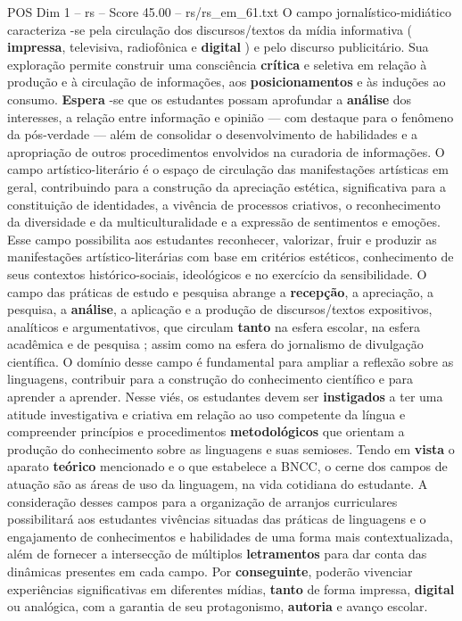 \begin{textsample}{POS Dim 1 – rs – Score 45.00 – rs/rs\_em\_61.txt}
O campo jornalístico-midiático caracteriza -se pela circulação dos discursos/textos da mídia informativa ( \textbf{impressa}, televisiva, radiofônica e \textbf{digital} ) e pelo discurso publicitário.
Sua exploração permite construir uma consciência \textbf{crítica} e seletiva em relação à produção e à circulação de informações, aos \textbf{posicionamentos} e às induções ao consumo. \textbf{Espera} -se que os estudantes possam aprofundar a \textbf{análise} dos interesses, a relação entre informação e opinião — com destaque para o fenômeno da pós-verdade — além de consolidar o desenvolvimento de habilidades e a apropriação de outros procedimentos envolvidos na curadoria de informações.
O campo artístico-literário é o espaço de circulação das manifestações artísticas em geral, contribuindo para a construção da apreciação estética, significativa para a constituição de identidades, a vivência de processos criativos, o reconhecimento da diversidade e da multiculturalidade e a expressão de sentimentos e emoções.
Esse campo possibilita aos estudantes reconhecer, valorizar, fruir e produzir as manifestações artístico-literárias com base em critérios estéticos, conhecimento de seus contextos histórico-sociais, ideológicos e no exercício da sensibilidade.
O campo das práticas de estudo e pesquisa abrange a \textbf{recepção}, a apreciação, a pesquisa, a \textbf{análise}, a aplicação e a produção de discursos/textos expositivos, analíticos e argumentativos, que circulam \textbf{tanto} na esfera escolar, na esfera acadêmica e de pesquisa ; assim como na esfera do jornalismo de divulgação científica.
O domínio desse campo é fundamental para ampliar a reflexão sobre as linguagens, contribuir para a construção do conhecimento científico e para aprender a aprender.
Nesse viés, os estudantes devem ser \textbf{instigados} a ter uma atitude investigativa e criativa em relação ao uso competente da língua e compreender princípios e procedimentos \textbf{metodológicos} que orientam a produção do conhecimento sobre as linguagens e suas semioses.
Tendo em \textbf{vista} o aparato \textbf{teórico} mencionado e o que estabelece a BNCC, o cerne dos campos de atuação são as áreas de uso da linguagem, na vida cotidiana do estudante.
A consideração desses campos para a organização de arranjos curriculares possibilitará aos estudantes vivências situadas das práticas de linguagens e o engajamento de conhecimentos e habilidades de uma forma mais contextualizada, além de fornecer a intersecção de múltiplos \textbf{letramentos} para dar conta das dinâmicas presentes em cada campo.
Por \textbf{conseguinte}, poderão vivenciar experiências significativas em diferentes mídias, \textbf{tanto} de forma impressa, \textbf{digital} ou analógica, com a garantia de seu protagonismo, \textbf{autoria} e avanço escolar.

\end{textsample}
